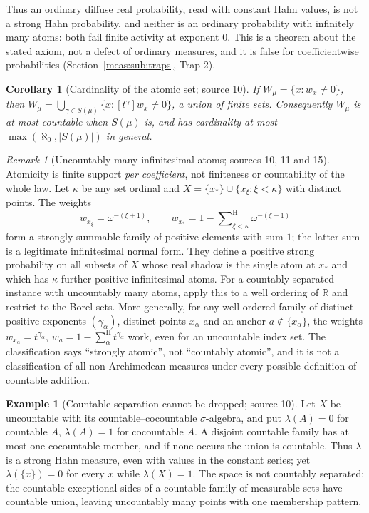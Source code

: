 \documentclass[11pt]{article}
\numberwithin{equation}{section}
\newtheorem{corollary}[theorem]{Corollary}
\theoremstyle{definition}
\newtheorem{example}[theorem]{Example}
\theoremstyle{remark}
\newtheorem{remark}[theorem]{Remark}
\newcommand{\R}{\mathbb R}
\newcommand{\coef}[2]{[t^{#1}]#2}
\newcommand{\hsum}{\mathop{\sum}\nolimits^{\mathrm H}}
\newcommand{\abs}[1]{\lvert#1\rvert}
\begin{document}
Thus an ordinary diffuse real probability, read with constant Hahn values, is
not a strong Hahn probability, and neither is an ordinary probability with
infinitely many atoms: both fail finite activity at exponent $0$. This is a
theorem about the stated axiom, not a defect of ordinary measures, and it is
false for coefficientwise probabilities (Section~\ref{meas:sub:traps}, Trap 2).

\begin{corollary}[Cardinality of the atomic set; source 10]
\label{meas:cor:cardinality}
If $W_\mu=\{x:w_x\ne0\}$, then
$W_\mu=\bigcup_{\gamma\in S(\mu)}\{x:\coef{\gamma}{w_x}\ne0\}$, a union of finite
sets. Consequently $W_\mu$ is at most countable when $S(\mu)$ is, and has
cardinality at most $\max(\aleph_0,\abs{S(\mu)})$ in general.
\end{corollary}

\begin{remark}[Uncountably many infinitesimal atoms; sources 10, 11 and 15]
\label{meas:rem:many-atoms}
Atomicity is finite support \emph{per coefficient}, not finiteness or
countability of the whole law. Let $\kappa$ be any set ordinal and
$X=\{x_\ast\}\cup\{x_\xi:\xi<\kappa\}$ with distinct points. The weights
\begin{equation}\label{meas:eq:many-atoms}
 w_{x_\xi}=\omega^{-(\xi+1)},\qquad
 w_{x_\ast}=1-\hsum_{\xi<\kappa}\omega^{-(\xi+1)}
\end{equation}
form a strongly summable family of positive elements with sum $1$; the latter
sum is a legitimate infinitesimal normal form. They define a positive strong
probability on all subsets of $X$ whose real shadow is the single atom at
$x_\ast$ and which has $\kappa$ further positive infinitesimal atoms. For a
countably separated instance with uncountably many atoms, apply this to a well
ordering of $\R$ and restrict to the Borel sets. More generally, for any
well-ordered family of distinct positive exponents $(\gamma_\alpha)$, distinct
points $x_\alpha$ and an anchor $a\notin\{x_\alpha\}$, the weights
$w_{x_\alpha}=t^{\gamma_\alpha}$,
$w_a=1-\hsum_\alpha t^{\gamma_\alpha}$ work, even for an uncountable index set.
The classification says ``strongly atomic'', not ``countably atomic'', and it is
not a classification of all non-Archimedean measures under every possible
definition of countable addition.
\end{remark}

\begin{example}[Countable separation cannot be dropped; source 10]
\label{meas:ex:cocountable}
Let $X$ be uncountable with its countable--cocountable $\sigma$-algebra, and
put $\lambda(A)=0$ for countable $A$, $\lambda(A)=1$ for cocountable $A$. A
disjoint countable family has at most one cocountable member, and if none
occurs the union is countable. Thus $\lambda$ is a strong Hahn measure, even
with values in the constant series; yet $\lambda(\{x\})=0$ for every $x$ while
$\lambda(X)=1$. The space is not countably separated: the countable exceptional
sides of a countable family of measurable sets have countable union, leaving
uncountably many points with one membership pattern.
\end{example}
\end{document}
